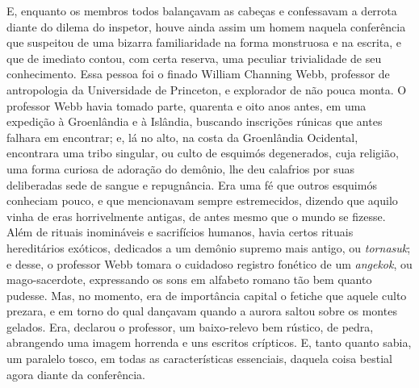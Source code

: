 \begin{pages}
\begin{Rightside}
E, enquanto os membros todos balançavam as cabeças e confessavam a
derrota diante do dilema do inspetor, houve ainda assim um homem naquela
conferência que suspeitou de uma bizarra familiaridade na forma
monstruosa e na escrita, e que de imediato contou, com certa reserva,
uma peculiar trivialidade de seu conhecimento. Essa pessoa foi o finado
William Channing Webb, professor de antropologia da Universidade de
Princeton, e explorador de não pouca monta. O professor Webb havia
tomado parte, quarenta e oito anos antes, em uma expedição à Groenlândia
e à Islândia, buscando inscrições rúnicas que antes falhara em
encontrar; e, lá no alto, na costa da Groenlândia Ocidental, encontrara
uma tribo singular, ou culto de esquimós degenerados, cuja religião, uma
forma curiosa de adoração do demônio, lhe deu calafrios por suas
deliberadas sede de sangue e repugnância. Era uma fé que outros esquimós
conheciam pouco, e que mencionavam sempre estremecidos, dizendo que
aquilo vinha de eras horrivelmente antigas, de antes mesmo que o mundo
se fizesse. Além de rituais inomináveis e sacrifícios humanos, havia
certos rituais hereditários exóticos, dedicados a um demônio supremo
mais antigo, ou \emph{tornasuk}; e desse, o professor Webb
tomara o cuidadoso registro fonético de um \emph{angekok}, ou
mago-sacerdote, expressando os sons em alfabeto romano tão bem quanto
pudesse. Mas, no momento, era de importância capital o fetiche que
aquele culto prezara, e em torno do qual dançavam quando a aurora saltou
sobre os montes gelados. Era, declarou o professor, um baixo-relevo bem
rústico, de pedra, abrangendo uma imagem horrenda e uns escritos
crípticos. E, tanto quanto sabia, um paralelo tosco, em todas as
características essenciais, daquela coisa bestial agora diante da
conferência.


\end{Rightside}
\end{pages}
